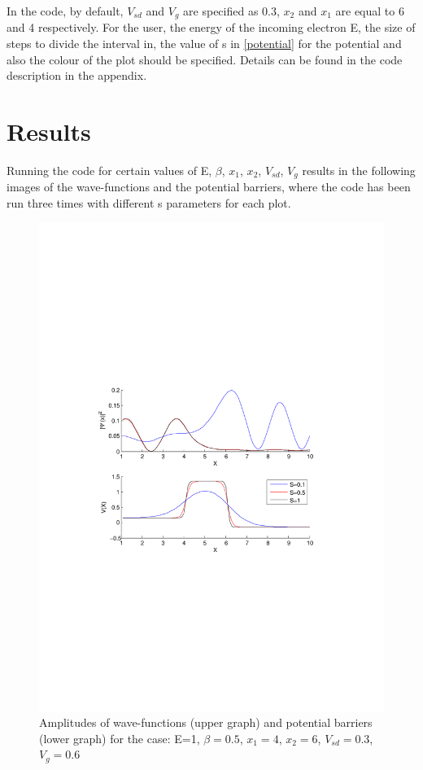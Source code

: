 \documentclass[a4paper]{article}
\begin{document}
In the code, by default, $V_{sd}$ and $V_g$ are specified as $0.3$, $x_2$ and $x_1$ are equal to 6 and 4 respectively.
For the user, the energy of the incoming electron E, the size of steps to divide the interval in, the value of s in \eqref{potential} for the potential and also the colour of the plot should be specified. Details can be found in the code description in the appendix.

\section{Results}
Running the code for certain values of E, $\beta$, $x_1$, $x_2$, $V_{sd}$, $V_g$ results in the following images of the wave-functions and the potential barriers, where the code has been run three times with different s parameters for each plot.
\begin{figure}[h!]
\centering
\includegraphics[width=4.5in, trim = 0mm 100mm 0mm 100mm, clip]{test}
\caption{Amplitudes of wave-functions (upper graph) and potential barriers (lower graph) for the case: E=1, $\beta=0.5$, $x_1=4$, $x_2=6$, $V_{sd}=0.3$, $V_g=0.6$}
\label{fig:test}
\end{figure}
\end{document}
